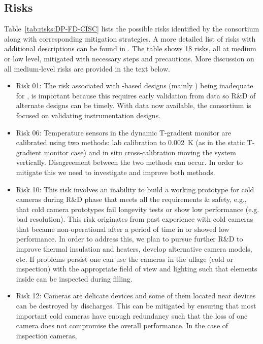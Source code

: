 \subsection{Risks}


Table~\ref{tab:risks:DP-FD-CISC} lists the possible risks identified by the  consortium along with corresponding mitigation strategies. 
A more detailed list of risks with additional descriptions can be found in \cite{bib:docdb7192}. The table shows 18 risks, all at medium or low level, mitigated with necessary steps and precautions. More discussion on all medium-level risks are provided in the text below. 
\begin{itemize}
    \item Risk 01: The risk associated with -based designs (mainly ) being inadequate for , is important because this requires early validation from  data so R\&D of alternate designs can be timely. With  data now available, the consortium is focused on validating instrumentation designs.
    \item Risk 06: Temperature sensors in the dynamic T-gradient monitor are calibrated using two methods: lab calibration to \SI{0.002}{K} (as in the static T-gradient monitor case) and in situ cross-calibration moving the system vertically. Disagreement between the two methods can occur. In order to mitigate this we need to investigate and improve both methods. 
    \item Risk 10: This risk involves an inability to build a working prototype for cold cameras during R\&D phase that meets all the requirements \& safety, e.g., that cold camera prototypes fail longevity tests or show low performance (e.g. bad resolution). This risk originates from past experience with cold cameras that became non-operational after a period of time in  or showed low performance. In order to address this, we plan to pursue further R\&D to improve thermal insulation and heaters, develop alternative camera models, etc. If problems persist one can use the cameras in the ullage (cold or inspection) with the appropriate field of view and lighting such that elements inside  can be inspected during filling.
    \item Risk 12: Cameras are delicate devices and some of them located near  devices can be destroyed by  discharges. This can be mitigated by ensuring that most important cold cameras have enough redundancy such that the loss of one camera does not compromise the overall performance. In the case of inspection cameras, %

\end{itemize}

